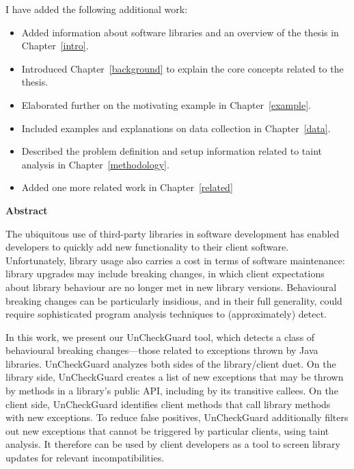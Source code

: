I have added the following additional work:

\begin{itemize}
  \item Added information about software libraries and an overview of the thesis in Chapter~\ref{intro}.
  \item Introduced Chapter~\ref{background} to explain the core concepts related to the thesis.
  \item Elaborated further on the motivating example in Chapter~\ref{example}.
  \item Included examples and explanations on data collection in Chapter~\ref{data}.
  \item Described the problem definition and setup information related to taint analysis in Chapter~\ref{methodology}.
  \item Added one more related work in Chapter~\ref{related}
\end{itemize}

\cleardoublepage
{}    %

\begin{center}\textbf{Abstract}\end{center}

      The ubiquitous use of third-party libraries in software development has enabled developers to quickly add
      new functionality to their client software. Unfortunately, library usage also carries a cost in
      terms of software maintenance: library upgrades may include breaking changes, in which client expectations
      about library behaviour are no longer met in new library versions. Behavioural breaking
      changes can be particularly insidious, and in their full generality, could require sophisticated program
      analysis techniques to (approximately) detect.

      In this work, we present our UnCheckGuard tool, which detects a class of behavioural breaking changes---those
      related to exceptions thrown by Java libraries. UnCheckGuard analyzes both sides of the library/client
      duet. On the library side, UnCheckGuard creates a list of new exceptions that may be thrown by methods
      in a library's public API, including by its transitive callees. On the client side, UnCheckGuard identifies
      client methods that call library methods with new exceptions. To reduce false positives, UnCheckGuard
      additionally filters out new exceptions that cannot be triggered by particular clients, using taint analysis. It therefore can be
      used by client developers as a tool to screen library updates for relevant incompatibilities.

